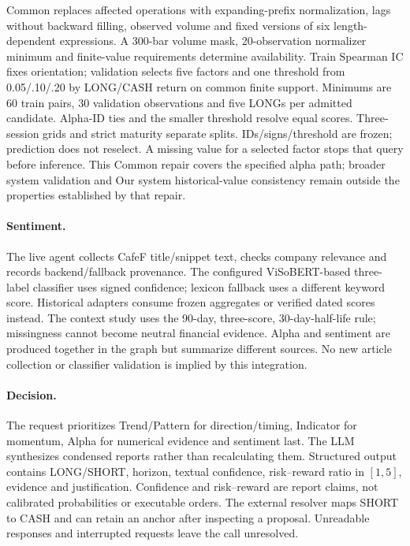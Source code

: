 Common replaces affected operations with expanding-prefix normalization,
lags without backward filling, observed volume and fixed versions of six
length-dependent expressions. A 300-bar volume mask, 20-observation
normalizer minimum and finite-value requirements determine availability.
Train Spearman IC fixes orientation; validation selects five factors and
one threshold from 0.05/.10/.20 by LONG/CASH return on common finite
support. Minimums are 60 train pairs, 30 validation observations and five
LONGs per admitted candidate. Alpha-ID ties and the smaller threshold
resolve equal scores. Three-session grids and strict maturity separate
splits. IDs/signs/threshold are frozen; prediction does not reselect.
A missing value for a selected factor stops that query before inference. This Common repair covers the specified alpha path;
broader system validation and Our system historical-value consistency remain
outside the properties established by that repair.

\paragraph{Sentiment.}
The live agent collects CafeF title/snippet text, checks company relevance
and records backend/fallback provenance. The configured ViSoBERT-based
three-label classifier uses signed confidence; lexicon fallback uses a
different keyword score. Historical adapters consume frozen aggregates
or verified dated scores instead. The context study uses the 90-day,
three-score, 30-day-half-life rule; missingness cannot become neutral
financial evidence. Alpha and sentiment are produced together in the
graph but summarize different sources. No new article collection or
classifier validation is implied by this integration.

\paragraph{Decision.}
The request prioritizes Trend/Pattern for direction/timing, Indicator for
momentum, Alpha for numerical evidence and sentiment last. The LLM
synthesizes condensed reports rather than recalculating them. Structured
output contains LONG/SHORT, horizon, textual confidence, risk--reward
ratio in $[1,5]$, evidence and justification. Confidence and risk--reward
are report claims, not calibrated probabilities or executable orders.
The external resolver maps SHORT to CASH and can retain an anchor after
inspecting a proposal. Unreadable responses and interrupted requests leave the call unresolved.

